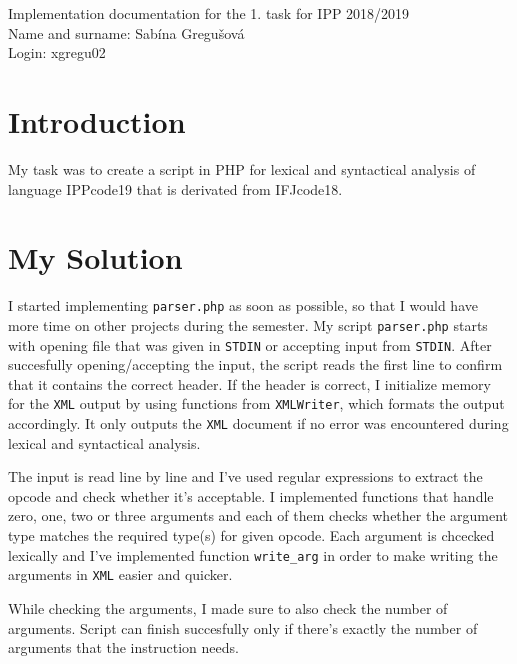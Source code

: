 \documentclass[10pt, a4paper]{article}
\begin{document}
\begin{center}
Implementation documentation for the 1. task for IPP 2018/2019\\
Name and surname: Sabína Gregušová\\
Login: xgregu02
\end{center}

\section*{Introduction}
My task was to create a script  in PHP for lexical and syntactical analysis of language IPPcode19 that is derivated from IFJcode18.
\section*{My Solution}
I started implementing \texttt{parser.php} as soon as possible, so that I would have more time on other projects during the semester. My script \texttt{parser.php} starts with opening file that was given in \texttt{STDIN} or accepting input from \texttt{STDIN}. After succesfully opening/accepting the input, the script reads the first line to confirm that it contains the correct header. If the header is correct, I initialize memory for the \texttt{XML} output by using functions from \texttt{XMLWriter}, which formats the output accordingly. It only outputs the \texttt{XML} document if no error was encountered during lexical and syntactical analysis.

The input is read line by line and I've used regular expressions to extract the opcode and check whether it's acceptable. I implemented functions that handle zero, one, two or three arguments and each of them checks whether the argument type matches the required type(s) for given opcode. Each argument is chcecked lexically and I've implemented function \texttt{write\_arg} in order to make writing the arguments in \texttt{XML} easier and quicker.

While checking the arguments, I made sure to also check the number of arguments. Script can finish succesfully only if there's exactly the number of arguments that the instruction needs. 
\end{document}
